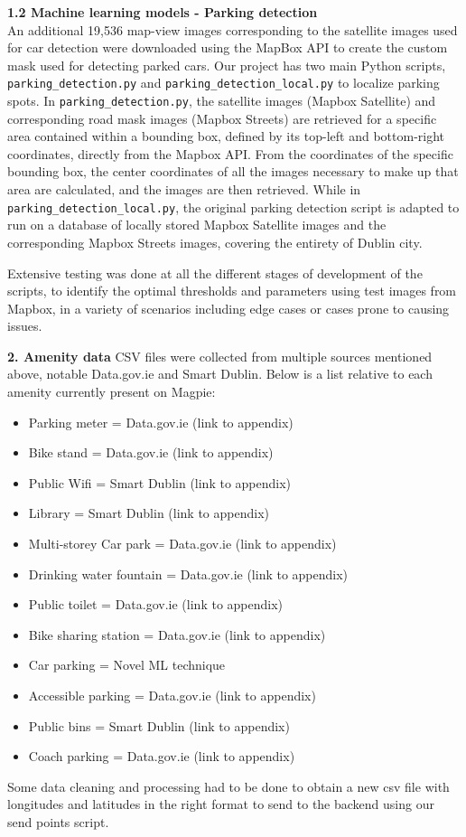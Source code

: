 \textbf{1.2 Machine learning models - Parking detection} \\
An additional 19,536 map-view images corresponding to the satellite images used
for car detection were downloaded using the MapBox API to create the custom mask
used for detecting parked cars. Our project has two main Python scripts,
\texttt{parking\_detection.py} and \texttt{parking\_detection\_local.py} to
localize parking spots. In \texttt{parking\_detection.py}, the satellite images
(Mapbox Satellite) and corresponding road mask images (Mapbox Streets) are
retrieved for a specific area contained within a bounding box, defined by its
top-left and bottom-right coordinates, directly from the Mapbox API. From the
coordinates of the specific bounding box, the center coordinates of all the
images necessary to make up that area are calculated, and the images are then
retrieved. While in \texttt{parking\_detection\_local.py}, the original parking
detection script is adapted to run on a database of locally stored Mapbox
Satellite images and the corresponding Mapbox Streets images, covering the
entirety of Dublin city.

Extensive testing was done at all the different stages of development of
the scripts, to identify the optimal thresholds and parameters using test images
from Mapbox, in a variety of scenarios including edge cases or cases prone to
causing issues.

\newpage{}

\textbf{2. Amenity data}
CSV files were collected from multiple sources mentioned above, notable
Data.gov.ie and Smart Dublin. Below is a list relative to each amenity currently
present on Magpie:
\begin{itemize}
    \item Parking meter = Data.gov.ie (link to appendix)
    \item Bike stand = Data.gov.ie (link to appendix)
    \item Public Wifi = Smart Dublin (link to appendix)
    \item Library = Smart Dublin (link to appendix)
    \item Multi-storey Car park = Data.gov.ie (link to appendix)
    \item Drinking water fountain = Data.gov.ie (link to appendix)
    \item Public toilet = Data.gov.ie (link to appendix)
    \item Bike sharing station = Data.gov.ie (link to appendix)
    \item Car parking = Novel ML technique
    \item Accessible parking = Data.gov.ie (link to appendix)
    \item Public bins = Smart Dublin (link to appendix)
    \item Coach parking = Data.gov.ie (link to appendix)
\end{itemize}
Some data cleaning and processing had to be done to obtain a new csv file with
longitudes and latitudes in the right format to send to the backend using our
send points script.

